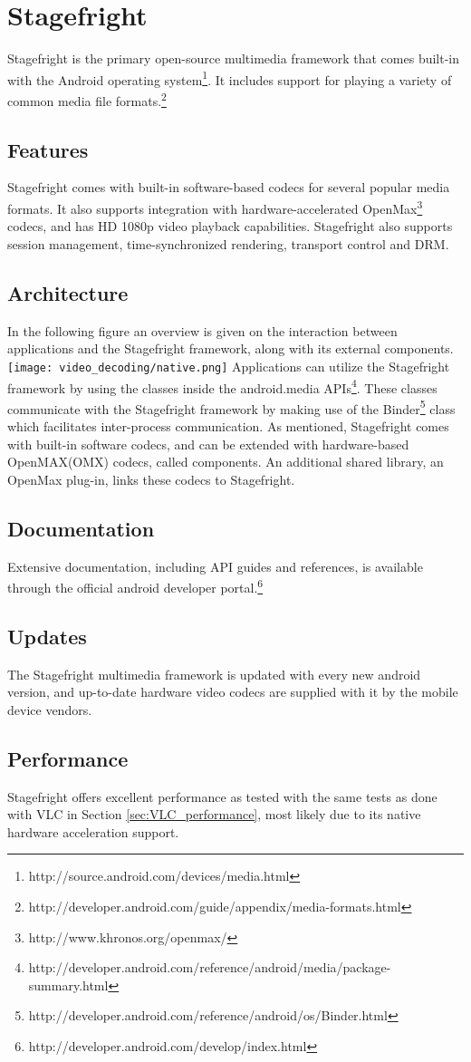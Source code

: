 \section{Stagefright}
Stagefright is the primary open-source multimedia framework that comes built-in with the Android operating system\footnote{http://source.android.com/devices/media.html}. It includes support for playing a variety of common media file formats.\footnote{http://developer.android.com/guide/appendix/media-formats.html}
\subsection{Features}
Stagefright comes with built-in software-based codecs for several popular media formats. It also supports integration with hardware-accelerated OpenMax\footnote{http://www.khronos.org/openmax/} codecs, and has HD 1080p video playback capabilities. Stagefright also supports session management, time-synchronized rendering, transport control and DRM.
\subsection{Architecture}
In the following figure an overview is given on the interaction between applications and the Stagefright framework, along with its external components.\\
\texttt{[image: video\_decoding/native.png]}
Applications can utilize the Stagefright framework by using the classes inside the android.media APIs\footnote{http://developer.android.com/reference/android/media/package-summary.html}. These classes communicate with the Stagefright framework by making use of the Binder\footnote{http://developer.android.com/reference/android/os/Binder.html} class which facilitates inter-process communication. As mentioned, Stagefright comes with built-in software codecs, and can be extended with hardware-based OpenMAX(OMX) codecs, called components. An additional shared library, an OpenMax plug-in, links these codecs to Stagefright.
\subsection{Documentation}
Extensive documentation, including API guides and references, is available through the official android developer portal.\footnote{http://developer.android.com/develop/index.html}
\subsection{Updates}
The Stagefright multimedia framework is updated with every new android version, and up-to-date hardware video codecs are supplied with it by the mobile device vendors.
\subsection{Performance}
Stagefright offers excellent performance as tested with the same tests as done with VLC in Section \ref{sec:VLC_performance}, most likely due to its native hardware acceleration support.


